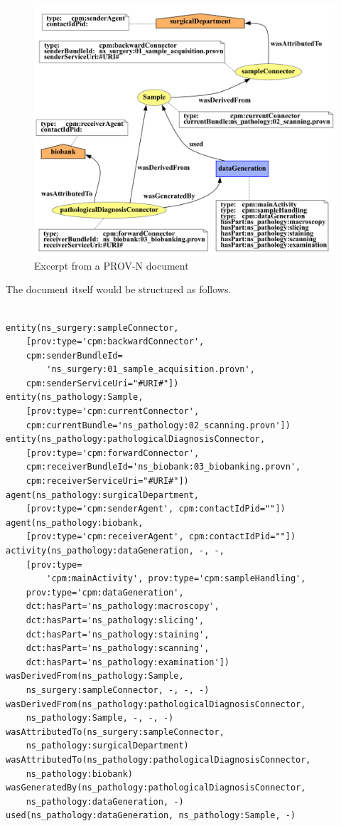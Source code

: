 \documentclass[
  digital,     %
  oneside,     %
  nosansbold,  %
  nocolorbold, %
  lof,         %
  lot,         %
]{fithesis4}
\begin{document}
\begin{figure}[htbp]
  \begin{center}
    \includegraphics[width=12.7cm]{fithesis/images/examplebigger.png}
  \end{center}
  \caption{Excerpt from a PROV-N document}
  \label{fig:bundleexample}
\end{figure}

The document itself would be structured as follows.

\begin{verbatim}

entity(ns_surgery:sampleConnector,
    [prov:type='cpm:backwardConnector',
    cpm:senderBundleId=
        'ns_surgery:01_sample_acquisition.provn', 
    cpm:senderServiceUri="#URI#"])
entity(ns_pathology:Sample, 
    [prov:type='cpm:currentConnector',
    cpm:currentBundle='ns_pathology:02_scanning.provn'])
entity(ns_pathology:pathologicalDiagnosisConnector, 
    [prov:type='cpm:forwardConnector',
    cpm:receiverBundleId='ns_biobank:03_biobanking.provn', 
    cpm:receiverServiceUri="#URI#"])
agent(ns_pathology:surgicalDepartment, 
    [prov:type='cpm:senderAgent', cpm:contactIdPid=""])
agent(ns_pathology:biobank, 
    [prov:type='cpm:receiverAgent', cpm:contactIdPid=""])
activity(ns_pathology:dataGeneration, -, -, 
    [prov:type=
        'cpm:mainActivity', prov:type='cpm:sampleHandling',
    prov:type='cpm:dataGeneration', 
    dct:hasPart='ns_pathology:macroscopy', 
    dct:hasPart='ns_pathology:slicing',
    dct:hasPart='ns_pathology:staining', 
    dct:hasPart='ns_pathology:scanning',
    dct:hasPart='ns_pathology:examination'])
wasDerivedFrom(ns_pathology:Sample, 
    ns_surgery:sampleConnector, -, -, -)
wasDerivedFrom(ns_pathology:pathologicalDiagnosisConnector, 
    ns_pathology:Sample, -, -, -)
wasAttributedTo(ns_surgery:sampleConnector, 
    ns_pathology:surgicalDepartment)
wasAttributedTo(ns_pathology:pathologicalDiagnosisConnector, 
    ns_pathology:biobank)
wasGeneratedBy(ns_pathology:pathologicalDiagnosisConnector, 
    ns_pathology:dataGeneration, -)
used(ns_pathology:dataGeneration, ns_pathology:Sample, -)
    
\end{verbatim}
\end{document}
